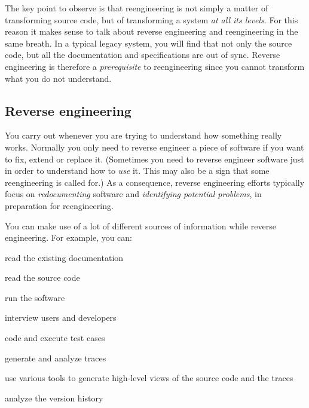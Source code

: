 \documentclass[a4paper,10pt,twoside]{book}
\begin{document}
The key point to observe is that reengineering is not simply a matter of transforming source code, but of transforming a system \emph{at all its levels}. For this reason it makes sense to talk about reverse engineering and reengineering in the same breath. In a typical legacy system, you will find that not only the source code, but all the documentation and specifications are out of sync. Reverse engineering is therefore a \emph{prerequisite} to reengineering since you cannot transform what you do not understand.

\subsection*{Reverse engineering}

You carry out  whenever you are trying to understand how something really works. Normally you only need to reverse engineer a piece of software if you want to fix, extend or replace it. (Sometimes you need to reverse engineer software just in order to understand how to \emph{use} it. This may also be a sign that some reengineering is called for.) As a consequence, reverse engineering efforts typically focus on \emph{redocumenting} software and \emph{identifying potential problems}, in preparation for reengineering.

You can make use of a lot of different sources of information while reverse engineering. For example, you can:

\begin{bulletlist}

  \item read the existing documentation

  \item read the source code

  \item run the software

  \item interview users and developers

  \item code and execute test cases

  \item generate and analyze traces

  \item use various tools to generate high-level views of the source code and the traces

  \item analyze the version history
\end{bulletlist}
\end{document}
